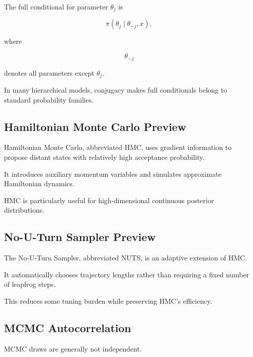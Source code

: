 The full conditional for parameter \(\theta_j\) is

\[
\boxed{
\pi
(
\theta_j
\mid
\theta_{-j},x
),
}
\]

where

\[
\theta_{-j}
\]

denotes all parameters except \(\theta_j\).

In many hierarchical models, conjugacy makes full conditionals belong to
standard probability families.

\subsection{Hamiltonian Monte Carlo Preview}
\label{subsec:hamiltonian-monte-carlo-preview}

Hamiltonian Monte Carlo, abbreviated HMC, uses gradient information to
propose distant states with relatively high acceptance probability.

It introduces auxiliary momentum variables and simulates approximate
Hamiltonian dynamics.

HMC is particularly useful for high-dimensional continuous posterior
distributions.

\subsection{No-U-Turn Sampler Preview}
\label{subsec:nuts-preview}

The No-U-Turn Sampler, abbreviated NUTS, is an adaptive extension of HMC.

It automatically chooses trajectory lengths rather than requiring a fixed
number of leapfrog steps.

This reduces some tuning burden while preserving HMC's efficiency.

\subsection{MCMC Autocorrelation}
\label{subsec:mcmc-autocorrelation}

MCMC draws are generally not independent.

